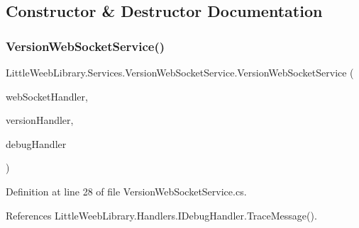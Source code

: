 \subsection{Constructor \& Destructor Documentation}
\mbox{\label{class_little_weeb_library_1_1_services_1_1_version_web_socket_service_ac36d79cd9d964d06594350e5971adb5e}} 
\subsubsection{\texorpdfstring{Version\+Web\+Socket\+Service()}{VersionWebSocketService()}}
{\footnotesize\ttfamily Little\+Weeb\+Library.\+Services.\+Version\+Web\+Socket\+Service.\+Version\+Web\+Socket\+Service (\begin{DoxyParamCaption}\item[{\mbox{\hyperlink{interface_little_weeb_library_1_1_handlers_1_1_i_web_socket_handler}{I\+Web\+Socket\+Handler}}}]{web\+Socket\+Handler,  }\item[{\mbox{\hyperlink{interface_little_weeb_library_1_1_handlers_1_1_i_version_handler}{I\+Version\+Handler}}}]{version\+Handler,  }\item[{\mbox{\hyperlink{interface_little_weeb_library_1_1_handlers_1_1_i_debug_handler}{I\+Debug\+Handler}}}]{debug\+Handler }\end{DoxyParamCaption})}



Definition at line 28 of file Version\+Web\+Socket\+Service.\+cs.



References Little\+Weeb\+Library.\+Handlers.\+I\+Debug\+Handler.\+Trace\+Message().


